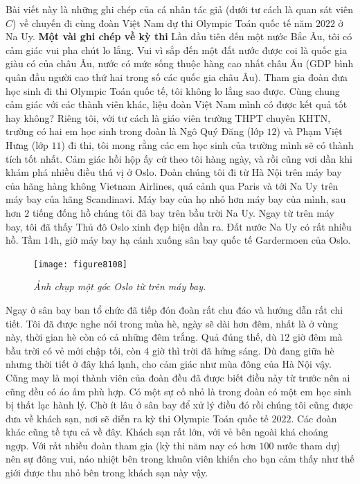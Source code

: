 \begin{multicols}{2}
	Bài viết này là những ghi chép của cá nhân tác giả (dưới tư cách là quan sát viên $C$) về chuyến đi cùng đoàn Việt Nam dự thi Olympic Toán quốc tế năm $2022$ ở Na Uy.
	\vskip 0.05cm
	{\bf\color{cackithi}Một vài ghi chép về kỳ thi}
	\vskip 0.05cm
	Lần đầu tiên đến một nước Bắc Âu, tôi có cảm giác vui pha chút lo lắng. Vui vì sắp đến một đất nước được coi là quốc gia giàu có của châu Âu, nước có mức sống thuộc hàng cao nhất châu Âu (GDP bình quân đầu người cao thứ hai trong số các quốc gia châu Âu). Tham gia đoàn đưa học sinh đi thi Olympic Toán quốc tế, tôi không lo lắng sao được. Cùng chung cảm giác với các thành viên khác, liệu đoàn Việt Nam mình có được kết quả tốt hay không? Riêng tôi, với tư cách là giáo viên trường THPT chuyên KHTN, trường có hai em học sinh trong đoàn là Ngô Quý Đăng (lớp $12$) và Phạm Việt Hưng (lớp $11$) đi thi, tôi mong rằng các em học sinh của trường mình sẽ có thành tích tốt nhất. Cảm giác hồi hộp ấy cứ theo tôi hàng ngày, và rồi cũng vơi dần khi khám phá nhiều điều thú vị ở Oslo.
	\vskip 0.05cm
	Đoàn chúng tôi đi từ Hà Nội trên máy bay của hãng hàng không Vietnam Airlines, quá cảnh qua Paris và tới Na Uy trên máy bay của hãng Scandinavi. Máy bay của họ nhỏ hơn máy bay của mình, sau hơn $2$ tiếng đống hồ chúng tôi đã bay trên bầu trời Na Uy. Ngay từ trên máy bay, tôi đã thấy Thủ đô Oslo xinh đẹp hiện dần ra. Đất nước Na Uy có rất nhiều hồ. Tầm $14$h, giờ máy bay hạ cánh xuống sân bay quốc tế Gardermoen của Oslo.
	\begin{figure}[H]
		\vspace*{-5pt}
		\centering
		\captionsetup{labelformat= empty, justification=centering}
		\texttt{[image: figure8108]}
		\caption{\small\textit{\color{cackithi}Ảnh chụp một góc Oslo từ trên máy bay.}}
		\vspace*{-10pt}
	\end{figure}
	Ngay ở sân bay ban tổ chức đã tiếp đón đoàn rất chu đáo và hướng dẫn rất chi tiết. Tôi đã được nghe nói trong mùa hè, ngày sẽ dài hơn đêm, nhất là ở vùng này, thời gian hè còn có cả những đêm trắng. Quả đúng thế, dù $12$ giờ đêm mà bầu trời có vẻ mới chập tối, còn $4$ giờ thì trời đã hửng sáng. Dù đang giữa hè nhưng thời tiết ở đây khá lạnh, cho cảm giác như mùa đông của Hà Nội vậy. Cũng may là mọi thành viên của đoàn đều đã được biết điều này từ trước nên ai cũng đều có áo ấm phù hợp. Có một sự cố nhỏ là trong đoàn có một em học sinh bị thất lạc hành lý. Chờ ít lâu ở sân bay để xử lý điều đó rồi chúng tôi cũng được đưa về khách sạn, nơi sẽ diễn ra kỳ thi Olympic Toán quốc tế $2022$. Các đoàn khác cũng tề tựu cả về đây. Khách sạn rất lớn, với vẻ bên ngoài khá choáng ngợp. Với rất nhiều đoàn tham gia (kỳ thi năm nay có hơn $100$ nước tham dự) nên sự đông vui, náo nhiệt bên trong khuôn viên khiến cho bạn cảm thấy như thế giới được thu nhỏ bên trong khách sạn này vậy. 

\end{multicols}
